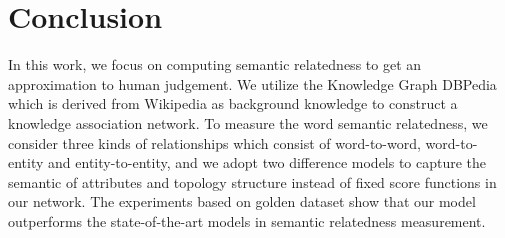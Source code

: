 \section{Conclusion}
In this work, we focus on computing semantic relatedness to get an approximation to human judgement.
We utilize the Knowledge Graph DBPedia which is derived from Wikipedia as background knowledge to construct
a knowledge association network. To measure the word semantic relatedness, we consider three kinds of relationships
which consist of  word-to-word, word-to-entity and entity-to-entity, and we adopt two difference models to capture
the semantic of attributes and topology structure instead of fixed score functions in our network.
The experiments based on golden dataset show that our model outperforms the state-of-the-art models in semantic relatedness measurement.